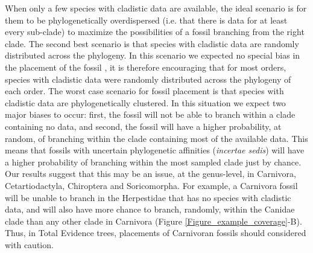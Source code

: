 \documentclass[12pt,letterpaper]{article}
\begin{document}
When only a few species with cladistic data are available, the ideal scenario is for them to be phylogenetically overdispersed (i.e. that there is data for at least every sub-clade) to maximize the possibilities of a fossil branching from the right clade.
The second best scenario is that species with cladistic data are randomly distributed across the phylogeny. 
In this scenario we expected no special bias in the placement of the fossil \citep{GuillermeCooper}, it is therefore encouraging that for most orders, species with cladistic data were randomly distributed across the phylogeny of each order.
The worst case scenario for fossil placement is that species with cladistic data are phylogenetically clustered. 
In this situation we expect two major biases to occur: first, the fossil will not be able to branch within a clade containing no data, and second, the fossil will have a higher probability, at random, of branching within the clade containing most of the available data.
This means that fossils with uncertain phylogenetic affinities (\textit{incertae sedis}) will have a higher probability of branching within the most sampled clade just by chance.
Our results suggest that this may be an issue, at the genus-level, in Carnivora, Cetartiodactyla, Chiroptera and Soricomorpha. 
For example, a Carnivora fossil will be unable to branch in the Herpestidae that has no species with cladistic data, and will also have more chance to branch, randomly, within the Canidae clade than any other clade in Carnivora (Figure \ref{Figure_example_coverage}-B).
Thus, in Total Evidence trees, placements of Carnivoran fossils should considered with caution. %
\end{document}
